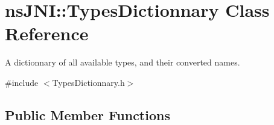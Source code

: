 \hypertarget{classnsJNI_1_1TypesDictionnary}{\section{ns\-J\-N\-I\-:\-:\-Types\-Dictionnary \-Class \-Reference}
\label{classnsJNI_1_1TypesDictionnary}
}


\-A dictionnary of all available types, and their converted names.  




{\ttfamily \#include $<$\-Types\-Dictionnary.\-h$>$}

\subsection*{\-Public \-Member \-Functions}
